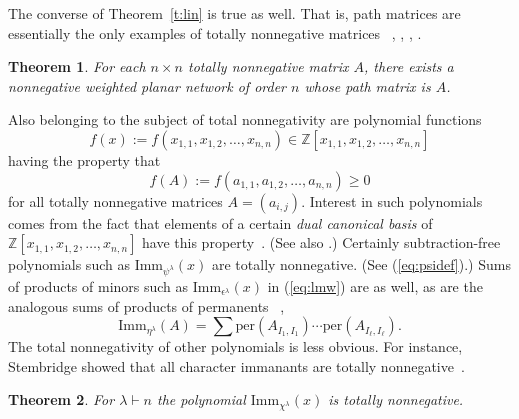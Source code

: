 \documentclass[12pt]{amsart}
\newtheorem{thm}{Theorem}[section]
\numberwithin{equation}{section}
\newcommand{\imm}[1]{\mathrm{Imm}_{#1}}
\newcommand{\defeq}{:=}
\newcommand{\perm}{\mathrm{per}}
\begin{document}
The converse of Theorem~\ref{t:lin} is true as well.
That is,
path matrices are essentially the only examples of totally nonnegative
matrices
~\cite{BrentiCTP}, \cite{CryerProp}, \cite{loewner}, \cite{WReduction}.
%
\begin{thm}\label{t:tnnconv}
  For each $n \times n$ totally nonnegative matrix $A$, there exists
  a nonnegative weighted planar network of order $n$
  whose path matrix is $A$.
\end{thm}

Also belonging to the subject of total nonnegativity are polynomial functions
\begin{equation*}
  f(x)
  \defeq
  f(x_{1,1}, x_{1,2}, \dotsc, x_{n,n}) \in
  \mathbb Z[x_{1,1},x_{1,2},\dotsc,x_{n,n}]
  \end{equation*}
having the property that
\begin{equation*}
  f(A) \defeq f(a_{1,1},a_{1,2},\dotsc,a_{n,n}) \geq 0
\end{equation*}
for all totally nonnegative matrices $A = (a_{i,j})$.
Interest in such polynomials comes from the fact that
elements of a certain {\em dual canonical basis} of
$\mathbb Z[x_{1,1}, x_{1,2}, \dotsc, x_{n,n}]$ have this property~\cite{LusztigTP}.
(See also \cite{RSkanKLImm}.)
Certainly subtraction-free polynomials such as
$\imm{\psi^\lambda}(x)$
are totally nonnegative.
(See (\ref{eq:psidef}).)
Sums of products of minors such as $\imm{\epsilon^\lambda}(x)$ in (\ref{eq:lmw})
are as well, as are the analogous sums of products of permanents
~\cite{LittlewoodTGC}, \cite{MerWatIneq}
\begin{equation}\label{eq:lmw2}
  \imm{\eta^\lambda}(A) = \sum \perm(A_{I_1,I_1}) \cdots \perm(A_{I_\ell,I_\ell}).
\end{equation}
The total nonnegativity of other polynomials is less obvious.
For instance, Stembridge showed that all character immanants are
totally nonnegative~\cite[Cor.\,3.3]{StemImm}.
\begin{thm}\label{t:stemimm}
  For $\lambda \vdash n$
  the polynomial $\imm{\chi^\lambda}(x)$ is totally nonnegative.
\end{thm}
\end{document}

